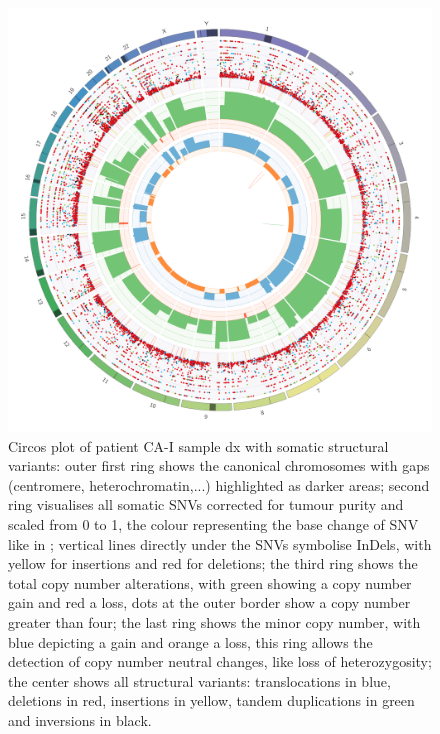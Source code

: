 \begin{figure}[ht]
\centering
\includegraphics[width=.99\linewidth]{Figures/CASCADE/CA51/CA51-Ep12P3369.circos.png}
\caption[Circos plot of patient CA-I sample dx]{Circos plot of patient CA-I sample dx with somatic structural variants: outer first ring shows the canonical chromosomes with gaps (centromere, heterochromatin,...) highlighted as darker areas; second ring visualises all somatic SNVs corrected for tumour purity and scaled from 0 to 1, the colour representing the base change of SNV like in \protect\textcite{Alexandrov2013}; vertical lines directly under the SNVs symbolise InDels, with yellow for insertions and red for deletions; the third ring shows the total copy number alterations, with green showing a copy number gain and red a loss, dots at the outer border show a copy number greater than four; the last ring shows the minor copy number, with blue depicting a gain and orange a loss, this ring allows the detection of copy number neutral changes, like loss of heterozygosity; the center shows all structural variants: translocations in blue, deletions in red, insertions in yellow, tandem duplications in green and inversions in black.} \label{fig:ca51.dxcircos}
\end{figure}


